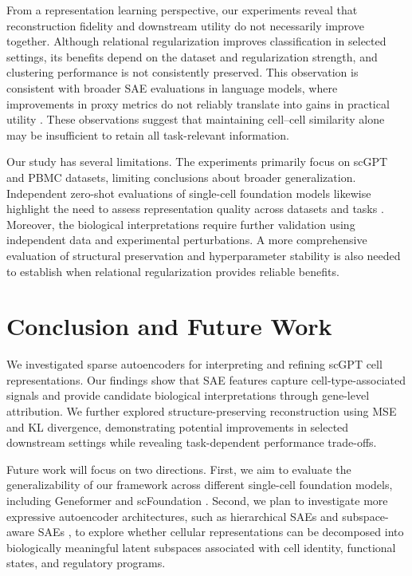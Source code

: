 \documentclass{article}
\begin{document}
From a representation learning perspective, our experiments reveal that reconstruction fidelity and downstream utility do not necessarily improve together. Although relational regularization improves classification in selected settings, its benefits depend on the dataset and regularization strength, and clustering performance is not consistently preserved. This observation is consistent with broader SAE evaluations in language models, where improvements in proxy metrics do not reliably translate into gains in practical utility \citep{karvonen2025}. These observations suggest that maintaining cell--cell similarity alone may be insufficient to retain all task-relevant information.

Our study has several limitations. The experiments primarily focus on scGPT and PBMC datasets, limiting conclusions about broader generalization. Independent zero-shot evaluations of single-cell foundation models likewise highlight the need to assess representation quality across datasets and tasks \citep{kedzierska2025}. Moreover, the biological interpretations require further validation using independent data and experimental perturbations. A more comprehensive evaluation of structural preservation and hyperparameter stability is also needed to establish when relational regularization provides reliable benefits.

\section{Conclusion and Future Work}
\label{sec:conclusion}

We investigated sparse autoencoders for interpreting and refining scGPT cell representations. Our findings show that SAE features capture cell-type-associated signals and provide candidate biological interpretations through gene-level attribution. We further explored structure-preserving reconstruction using MSE and KL divergence, demonstrating potential improvements in selected downstream settings while revealing task-dependent performance trade-offs.

Future work will focus on two directions. First, we aim to evaluate the generalizability of our framework across different single-cell foundation models, including Geneformer \citep{theodoris2023} and scFoundation \citep{hao2024}. Second, we plan to investigate more expressive autoencoder architectures, such as hierarchical SAEs \citep{bussmann2025} and subspace-aware SAEs \citep{dalili2026}, to explore whether cellular representations can be decomposed into biologically meaningful latent subspaces associated with cell identity, functional states, and regulatory programs.
\end{document}
